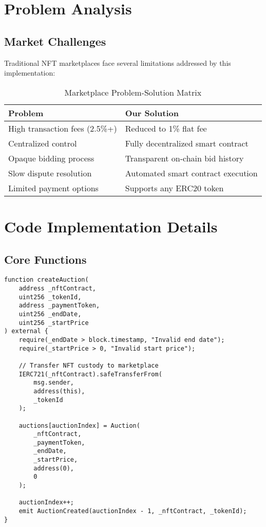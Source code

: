 \documentclass{article}
\begin{document}
\section{Problem Analysis}

\subsection{Market Challenges}
Traditional NFT marketplaces face several limitations addressed by this implementation:

\begin{table}[h]
\centering
\begin{tabular}{p{5cm} p{5cm}}
\toprule
\textbf{Problem} & \textbf{Our Solution} \\
\midrule
High transaction fees (2.5\%+) & Reduced to 1\% flat fee \\
Centralized control & Fully decentralized smart contract \\
Opaque bidding process & Transparent on-chain bid history \\
Slow dispute resolution & Automated smart contract execution \\
Limited payment options & Supports any ERC20 token \\
\bottomrule
\end{tabular}
\caption{Marketplace Problem-Solution Matrix}
\end{table}

\section{Code Implementation Details}

\subsection{Core Functions}

\begin{lstlisting}[language=Solidity,caption={Auction Creation Function}]
function createAuction(
    address _nftContract,
    uint256 _tokenId,
    address _paymentToken,
    uint256 _endDate,
    uint256 _startPrice
) external {
    require(_endDate > block.timestamp, "Invalid end date");
    require(_startPrice > 0, "Invalid start price");
    
    // Transfer NFT custody to marketplace
    IERC721(_nftContract).safeTransferFrom(
        msg.sender,
        address(this),
        _tokenId
    );
    
    auctions[auctionIndex] = Auction(
        _nftContract,
        _paymentToken,
        _endDate,
        _startPrice,
        address(0),
        0
    );
    
    auctionIndex++;
    emit AuctionCreated(auctionIndex - 1, _nftContract, _tokenId);
}
\end{lstlisting}
\end{document}
